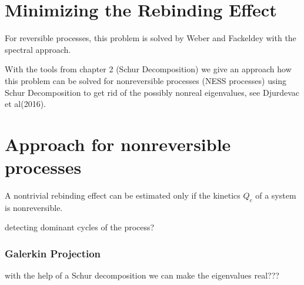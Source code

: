 \section{Minimizing the Rebinding Effect}

For reversible processes, this problem is solved by Weber and Fackeldey \cite{weber2014} with the
spectral approach.

With the tools from chapter 2 (Schur Decomposition) we give an approach how this problem can be solved
for nonreversible processes (NESS processes) using Schur Decomposition to get rid of the possibly nonreal eigenvalues, see Djurdevac et al\cite{djur2016}(2016).

\section{Approach for nonreversible processes}

A nontrivial rebinding effect can be estimated only if the kinetics $Q_c$ of a system is nonreversible.

detecting dominant cycles of the process?
\subsubsection*{Galerkin Projection}
with the help of a Schur decomposition we can make the eigenvalues real???